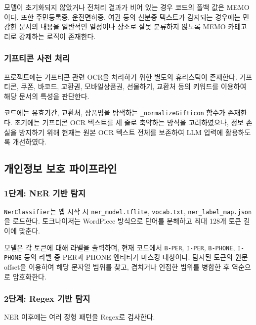 \documentclass[11pt,a4paper]{article}
\begin{document}
모델이 초기화되지 않았거나 전처리 결과가 비어 있는 경우 코드의 폴백 값은 MEMO이다. 또한 주민등록증, 운전면허증, 여권 등의 신분증 텍스트가 감지되는 경우에는 민감한 문서의 내용을 일반적인 일정이나 장소로 잘못 분류하지 않도록 MEMO 카테고리로 강제하는 로직이 존재한다.

\subsubsection{기프티콘 사전 처리}

프로젝트에는 기프티콘 관련 OCR을 처리하기 위한 별도의 휴리스틱이 존재한다. 기프티콘, 쿠폰, 바코드, 교환권, 모바일상품권, 선물하기, 교환처 등의 키워드를 이용하여 해당 문서의 특성을 판단한다.

코드에는 유효기간, 교환처, 상품명을 탐색하는 \texttt{\_normalizeGifticon} 함수가 존재한다. 초기에는 기프티콘 OCR 텍스트를 세 줄로 축약하는 방식을 고려하였으나, 정보 손실을 방지하기 위해 현재는 원본 OCR 텍스트 전체를 보존하여 LLM 입력에 활용하도록 개선하였다\cite{ref_revise}.

\subsection{개인정보 보호 파이프라인}

\subsubsection{1단계: NER 기반 탐지}

\texttt{NerClassifier}는 앱 시작 시 \texttt{ner\_model.tflite}, \texttt{vocab.txt}, \texttt{ner\_label\_map.json}을 로드한다. 토크나이저는 WordPiece 방식으로 단어를 분해하고 최대 128개 토큰 길이에 맞춘다.

모델은 각 토큰에 대해 라벨을 출력하며, 현재 코드에서 \texttt{B-PER}, \texttt{I-PER}, \texttt{B-PHONE}, \texttt{I-PHONE} 등의 라벨 중 PER과 PHONE 엔티티가 마스킹 대상이다. 탐지된 토큰의 원문 offset을 이용하여 해당 문자열 범위를 찾고, 겹치거나 인접한 범위를 병합한 후 역순으로 암호화한다.

\subsubsection{2단계: Regex 기반 탐지}

NER 이후에는 여러 정형 패턴을 Regex로 검사한다.
\end{document}
